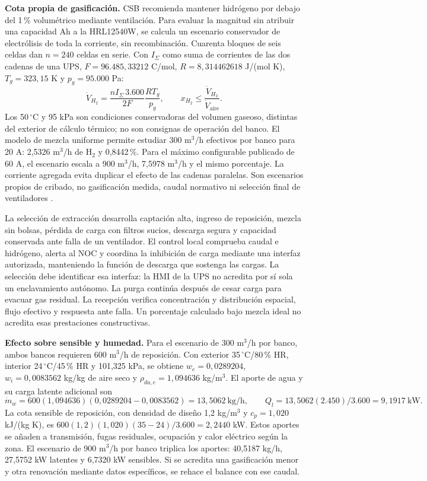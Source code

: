 \textbf{Cota propia de gasificación.} CSB recomienda mantener hidrógeno por debajo del 1\,\% volumétrico mediante ventilación. Para evaluar la magnitud sin atribuir una capacidad Ah a la HRL12540W, se calcula un escenario conservador de electrólisis de toda la corriente, sin recombinación. Cuarenta bloques de seis celdas dan $n=240$ celdas en serie. Con $I_\Sigma$ como suma de corrientes de las dos cadenas de una UPS, $F=96.485,33212$ C/mol, $R=8,314462618$ J/(mol K), $T_g=323,15$ K y $p_g=95.000$ Pa:
\[
\dot V_{H_2}=\frac{nI_\Sigma\,3.600}{2F}\frac{RT_g}{p_g},
\qquad x_{H_2}\leq\frac{\dot V_{H_2}}{\dot V_{\mathrm{aire}}}.
\]
Los 50\,$^{\circ}$C y 95 kPa son condiciones conservadoras del volumen gaseoso, distintas del exterior de cálculo térmico; no son consignas de operación del banco. El modelo de mezcla uniforme permite estudiar 300 m$^3$/h efectivos por banco para 20 A: 2,5326 m$^3$/h de H$_2$ y 0,8442\,\%. Para el máximo configurable publicado de 60 A, el escenario escala a 900 m$^3$/h, 7,5978 m$^3$/h y el mismo porcentaje. La corriente agregada evita duplicar el efecto de las cadenas paralelas. Son escenarios propios de cribado, no gasificación medida, caudal normativo ni selección final de ventiladores \parencites{csbManualJunio2025}[p.~98]{p7-eaton-93t-guia}{nistCODATA2022}.

La selección de extracción desarrolla captación alta, ingreso de reposición, mezcla sin bolsas, pérdida de carga con filtros sucios, descarga segura y capacidad conservada ante falla de un ventilador. El control local comprueba caudal e hidrógeno, alerta al NOC y coordina la inhibición de carga mediante una interfaz autorizada, manteniendo la función de descarga que sostenga las cargas. La selección debe identificar esa interfaz: la HMI de la UPS no acredita por sí sola un enclavamiento autónomo. La purga continúa después de cesar carga para evacuar gas residual. La recepción verifica concentración y distribución espacial, flujo efectivo y respuesta ante falla. Un porcentaje calculado bajo mezcla ideal no acredita esas prestaciones constructivas.

\textbf{Efecto sobre sensible y humedad.} Para el escenario de 300 m$^3$/h por banco, ambos bancos requieren 600 m$^3$/h de reposición. Con exterior 35\,$^{\circ}$C/80\,\% HR, interior 24\,$^{\circ}$C/45\,\% HR y 101,325 kPa, se obtiene $w_e=0,0289204$, $w_i=0,0083562$ kg/kg de aire seco y $\rho_{da,e}=1,094636$ kg/m$^3$. El aporte de agua y su carga latente adicional son
\[
\dot m_w=600(1,094636)(0,0289204-0,0083562)
        =13,5062\ \mathrm{kg/h},\qquad
Q_l=13,5062(2.450)/3.600=9,1917\ \mathrm{kW}.
\]
La cota sensible de reposición, con densidad de diseño 1,2 kg/m$^3$ y $c_p=1,020$ kJ/(kg K), es $600(1,2)(1,020)(35-24)/3.600=2,2440$ kW. Estos aportes se añaden a transmisión, fugas residuales, ocupación y calor eléctrico según la zona. El escenario de 900 m$^3$/h por banco triplica los aportes: 40,5187 kg/h, 27,5752 kW latentes y 6,7320 kW sensibles. Si se acredita una gasificación menor y otra renovación mediante datos específicos, se rehace el balance con ese caudal.

